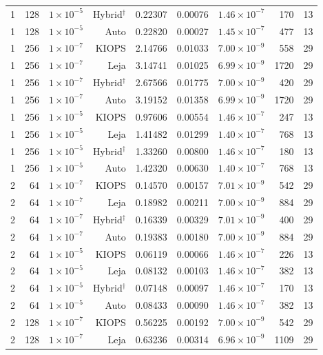 \begin{longtable}{@{}rrrrrrrrr@{}}
1 & 128 & $1\times10^{-5}$ & Hybrid$^\dagger$ & 0.22307 & 0.00076 & $1.46\times10^{-7}$ & 170 & 13 \\
1 & 128 & $1\times10^{-5}$ & Auto & 0.22820 & 0.00027 & $1.45\times10^{-7}$ & 477 & 13 \\
1 & 256 & $1\times10^{-7}$ & KIOPS & 2.14766 & 0.01033 & $7.00\times10^{-9}$ & 558 & 29 \\
1 & 256 & $1\times10^{-7}$ & Leja & 3.14741 & 0.01025 & $6.99\times10^{-9}$ & 1720 & 29 \\
1 & 256 & $1\times10^{-7}$ & Hybrid$^\dagger$ & 2.67566 & 0.01775 & $7.00\times10^{-9}$ & 420 & 29 \\
1 & 256 & $1\times10^{-7}$ & Auto & 3.19152 & 0.01358 & $6.99\times10^{-9}$ & 1720 & 29 \\
1 & 256 & $1\times10^{-5}$ & KIOPS & 0.97606 & 0.00554 & $1.46\times10^{-7}$ & 247 & 13 \\
1 & 256 & $1\times10^{-5}$ & Leja & 1.41482 & 0.01299 & $1.40\times10^{-7}$ & 768 & 13 \\
1 & 256 & $1\times10^{-5}$ & Hybrid$^\dagger$ & 1.33260 & 0.00800 & $1.46\times10^{-7}$ & 180 & 13 \\
1 & 256 & $1\times10^{-5}$ & Auto & 1.42320 & 0.00630 & $1.40\times10^{-7}$ & 768 & 13 \\
2 & 64 & $1\times10^{-7}$ & KIOPS & 0.14570 & 0.00157 & $7.01\times10^{-9}$ & 542 & 29 \\
2 & 64 & $1\times10^{-7}$ & Leja & 0.18982 & 0.00211 & $7.00\times10^{-9}$ & 884 & 29 \\
2 & 64 & $1\times10^{-7}$ & Hybrid$^\dagger$ & 0.16339 & 0.00329 & $7.01\times10^{-9}$ & 400 & 29 \\
2 & 64 & $1\times10^{-7}$ & Auto & 0.19383 & 0.00180 & $7.00\times10^{-9}$ & 884 & 29 \\
2 & 64 & $1\times10^{-5}$ & KIOPS & 0.06119 & 0.00066 & $1.46\times10^{-7}$ & 226 & 13 \\
2 & 64 & $1\times10^{-5}$ & Leja & 0.08132 & 0.00103 & $1.46\times10^{-7}$ & 382 & 13 \\
2 & 64 & $1\times10^{-5}$ & Hybrid$^\dagger$ & 0.07148 & 0.00097 & $1.46\times10^{-7}$ & 170 & 13 \\
2 & 64 & $1\times10^{-5}$ & Auto & 0.08433 & 0.00090 & $1.46\times10^{-7}$ & 382 & 13 \\
2 & 128 & $1\times10^{-7}$ & KIOPS & 0.56225 & 0.00192 & $7.00\times10^{-9}$ & 542 & 29 \\
2 & 128 & $1\times10^{-7}$ & Leja & 0.63236 & 0.00314 & $6.96\times10^{-9}$ & 1109 & 29 \\

\end{longtable}
